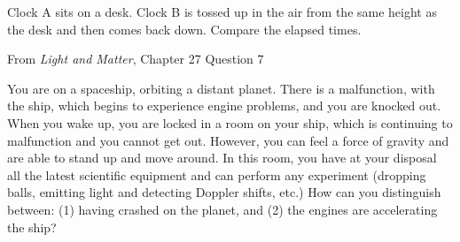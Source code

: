 \documentclass[12pt]{exam}
\begin{document}
\begin{questions}
	
	\question Clock A sits on a desk. Clock B is tossed up in the air from the same height as the desk and then comes back down. Compare the elapsed times.
	
	From \textit{Light and Matter}, Chapter 27 Question 7
	\vspace{0.75in}
	
	\question You are on a spaceship, orbiting a distant planet. There is a malfunction, with the ship, which begins to experience engine problems, and you are knocked out. When you wake up, you are locked in a room on your ship, which is continuing to malfunction and you cannot get out. However, you can feel a force of gravity and are able to stand up and move around. In this room, you have at your disposal all the latest scientific equipment and can perform any experiment (dropping balls, emitting light and detecting Doppler shifts, etc.) How can you distinguish between: (1) having crashed on the planet, and (2) the engines are accelerating the ship?
	\vspace{1.5in}

\end{questions}
\end{document}
